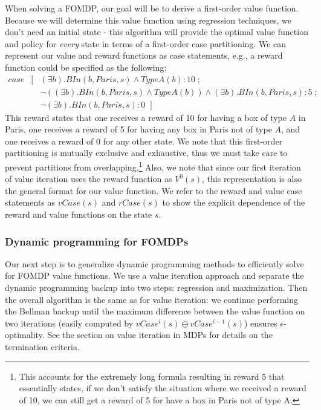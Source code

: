 \hskip -1pc
When solving a FOMDP, our goal will be to derive a first-order value
function.  Because we will determine this
value function using regression techniques, we don't need an initial
state - this algorithm will provide the optimal value function and
policy for \emph{every} state in terms of a first-order case partitioning.
We can represent our value and reward functions as case statements,
e.g., a reward function could be specified as the following:
\begin{eqnarray*}
case & [ & (\exists b). BIn(b, Paris, s) \wedge TypeA(b): 10 \; ; \;  \\
     &   & \lnot ((\exists b). BIn(b, Paris, s) \wedge TypeA(b)) \wedge (\exists b). BIn(b, Paris, s): 5 \; ; \; \\
     &   & \lnot (\exists b). BIn(b, Paris, s): 0 \; \; ] \;
\end{eqnarray*}
This reward states that one receives a reward of 10 for having a box of type $A$ in Paris,
one receives a reward of 5 for having any box in Paris not of type $A$, and one receives
a reward of 0 for any other state.
We note that this first-order partitioning is mutually exclusive and exhaustive,
thus we must take care to prevent partitions from overlapping.\footnote{This accounts for
the extremely long formula resulting in reward 5 that essentially states, if
we don't satisfy the situation where we received a reward of 10, we can still get a
reward of 5 for have a box in Paris not of type A.}
Also, we note that since our first iteration of value iteration uses the reward function
as $V^0(s)$, this representation is also the general format for our
value function.  We refer to the reward and value case statements
as $vCase(s)$ and $rCase(s)$ to show the explicit dependence of the reward
and value functions on the state $s$.


\subsubsection{Dynamic programming for FOMDPs}

Our next step is to generalize dynamic programming methods to
efficiently solve for FOMDP value functions.  We use a value iteration
approach and separate the dynamic programming backup into two steps:
regression and maximization.  Then the overall algorithm is the same
as for value iteration: we continue performing the Bellman backup until the
maximum difference between the value function on two iterations
(easily computed by $vCase^{i}(s) \ominus vCase^{i-1}(s)$) ensures
$\epsilon$-optimality.  See the section on value iteration in MDPs for
details on the termination criteria.

